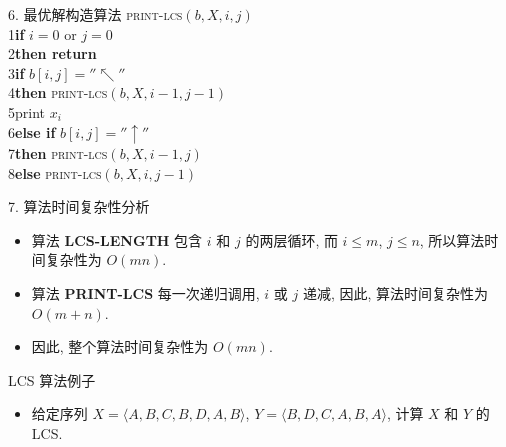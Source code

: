 \documentclass[fontset=fandol,UTF8,fleqn]{beamer}
\begin{document}
\begin{frame}{6. 最优解构造算法}
\textsc{print-lcs}$(b,X,i,j)$\\
1\qquad \textbf{if} $i = 0$ or $j = 0$\\
2\qquad \qquad      \textbf{then return}\\
3\qquad  \textbf{if} $b[i, j] = ''\nwarrow''$\\
4\qquad \qquad \textbf{then} \textsc{print-lcs}$(b,X,i - 1, j - 1)$\\
5\qquad \qquad \qquad  print $x_i$\\
6\qquad \textbf{else if} $b[i,j] = ''\uparrow''$\\
7\qquad \qquad \textbf{then} \textsc{print-lcs}$(b,X,i - 1,j)$\\
8\qquad  \textbf{else} \textsc{print-lcs}$(b,X,i, j - 1)$
\end{frame}

\begin{frame}{7. 算法时间复杂性分析}
  \begin{itemize}[<+-|alert@+>]
\item 算法 \textbf{LCS-LENGTH} 包含 $i$ 和 $j$ 的两层循环, 而 $i\leq m$, $j\leq n$, 所以算法时间复杂性为 $O(mn)$. 
\item 算法 \textbf{PRINT-LCS} 每一次递归调用, $i$ 或 $j$ 递减,  因此, 算法时间复杂性为  $O(m + n)$. 
\item 因此, 整个算法时间复杂性为 $O(mn)$. 
\end{itemize}
\end{frame}

\begin{frame}{LCS 算法例子}
  \begin{itemize}[<+-|alert@+>]
\item 
给定序列 $X=\langle A, B, C, B, D, A, B \rangle$, $Y=\langle B, D, C, A, B, A \rangle$, 计算 $X$ 和 $Y$ 的 LCS.
\end{itemize}
\end{frame}
\end{document}
